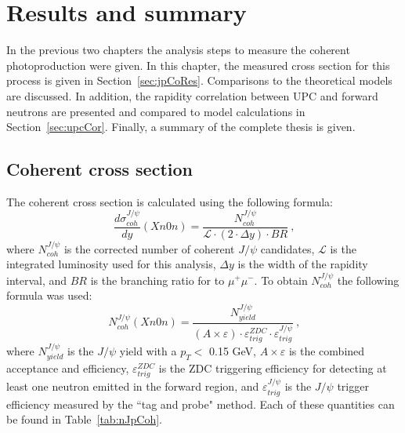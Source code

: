 \chapter{Results and summary}
  In the previous two chapters the analysis steps to measure the coherent
    \JPsi{} photoproduction were given.
  In this chapter, the measured cross section for this process is given
    in Section~\ref{sec:jpCoRes}.
  Comparisons to the theoretical models are discussed. 
  In addition, the rapidity correlation between UPC \JPsi{} and forward
    neutrons are presented and compared to model calculations in 
    Section~\ref{sec:upcCor}. 
  Finally, a summary of the complete thesis is given.  
  
  \section{Coherent \JPsi{} cross section\label{sec:jpCoRes}}
    The coherent \JPsi{} cross section is calculated using the following
      formula:
    \begin{equation}
    \frac{d\sigma^{J/\psi}_{coh}}{dy} (Xn0n)= \frac{N^{J/\psi}_{coh}}{\mathcal{L} \cdot (2 \cdot \Delta y )\cdot BR}~\textrm{,}
    \label{eq:expXSecCo}
    \end{equation}
      where $N^{J/\psi}_{coh}$ is the corrected number of coherent $J/\psi$
      candidates,  $\mathcal{L}$ is the integrated luminosity used for this 
      analysis, $\Delta y$ is the width of the rapidity interval, and $BR$ is 
      the branching ratio for \JPsi{} to $\mu^{+}\mu^{-}$. 
    To obtain $N^{J/\psi}_{coh}$ the following formula was used:
    \begin{equation}
    N^{J/\psi}_{coh}(Xn0n) = \frac{N^{J/\psi}_{yield}}{(A\times \varepsilon) \cdot \varepsilon^{ZDC}_{trig} \cdot \varepsilon^{J/\psi}_{trig}}~\textrm{,}
    \end{equation}
      where $N^{J/\psi}_{yield}$ is the $J/\psi$ yield with a $p_{T} <$ 0.15 
      GeV, $A\times \varepsilon$ is the combined acceptance and efficiency, 
      $\varepsilon^{ZDC}_{trig}$ is the ZDC triggering efficiency for detecting
      at least one neutron emitted in the forward region, and 
      $\varepsilon^{J/\psi}_{trig}$ is the $J/\psi$ trigger efficiency measured
      by the ``tag and probe" method. 
    Each of these quantities can be found in Table~\ref{tab:nJpCoh}.
